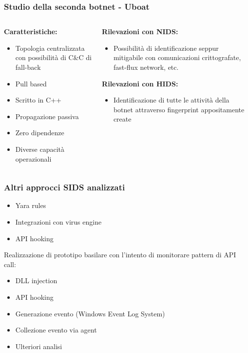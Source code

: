 \begin{frame}
    \frametitle{Studio della seconda botnet - Uboat }
    \begin{columns}[t]
        \begin{column}{0.5\textwidth}
            \textbf{Caratteristiche:}
            \begin{itemize}
                \item Topologia centralizzata con possibilità di C\&C di fall-back
                \item Pull based
                \item Scritto in C++
                \item Propagazione passiva
                \item Zero dipendenze
                \item Diverse capacità operazionali
            \end{itemize}
        \end{column}
        \begin{column}{0.5\textwidth}
            \textbf{Rilevazioni con NIDS:}
            \begin{itemize}
                \item Possibilità di identificazione seppur mitigabile con comunicazioni crittografate, fast-flux network, etc.
            \end{itemize}
            \textbf{Rilevazioni con HIDS:}
            \begin{itemize}
                \item Identificazione di tutte le attività della botnet attraverso fingerprint appositamente create
            \end{itemize}

        \end{column}
    \end{columns}
\end{frame}

\begin{frame}
    \frametitle{Altri approcci SIDS analizzati}
    \begin{itemize}
        \centering
        \item Yara rules
        \item Integrazioni con virus engine
        \item API hooking
    \end{itemize}

    \medskip

    Realizzazione di prototipo basilare con l'intento di monitorare pattern di API call:
    \begin{itemize}
        \item DLL injection
        \item API hooking
        \item Generazione evento (Windows Event Log System)
        \item Collezione evento via agent
        \item Ulteriori analisi
    \end{itemize}

\end{frame}

